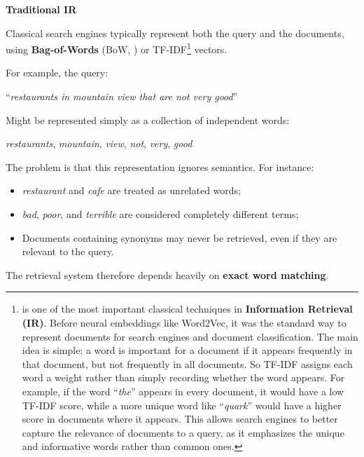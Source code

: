 \highspace
\begin{flushleft}
    \textcolor{Red2}{ \textbf{Traditional IR}}
\end{flushleft}
Classical search engines typically represent both the query and the documents, using \textbf{Bag-of-Words} (BoW, ) or TF-IDF\footnote{%
     is one of the most important classical techniques in \textbf{Information Retrieval (IR)}. Before neural embeddings like Word2Vec, it was the standard way to represent documents for search engines and document classification. The main idea is simple: a word is important for a document if it appears frequently in that document, but not frequently in all documents. So TF-IDF assigns each word a weight rather than simply recording whether the word appears. For example, if the word ``\emph{the}'' appears in every document, it would have a low TF-IDF score, while a more unique word like ``\emph{quark}'' would have a higher score in documents where it appears. This allows search engines to better capture the relevance of documents to a query, as it emphasizes the unique and informative words rather than common ones.
} vectors.

\highspace
For example, the query:
\begin{center}
    ``\emph{restaurants in mountain view that are not very good}''
\end{center}
\noindent
Might be represented simply as a collection of independent words:
\begin{center}
    \emph{restaurants}, \emph{mountain}, \emph{view}, \emph{not}, \emph{very}, \emph{good}
\end{center}
\noindent
The problem is that this representation ignores semantics. For instance:
\begin{itemize}
    \item \emph{restaurant} and \emph{cafe} are treated as unrelated words;
    \item \emph{bad}, \emph{poor}, and \emph{terrible} are considered completely different terms;
    \item Documents containing synonyms may never be retrieved, even if they are relevant to the query.
\end{itemize}
The retrieval system therefore depends heavily on \textbf{exact word matching}.

